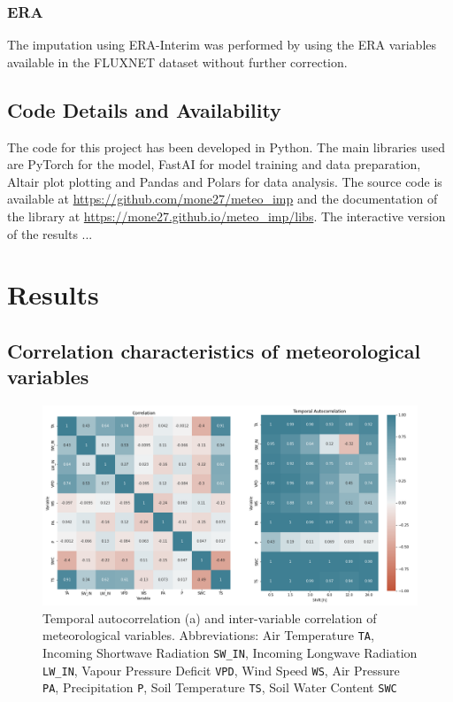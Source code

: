 \documentclass{article}
\let\Oldsection\section
\renewcommand{\section}{\FloatBarrier\Oldsection}
\let\Oldsubsection\subsection
\renewcommand{\subsection}{\FloatBarrier\Oldsubsection}
\begin{document}
\subsubsection{ERA} The imputation using ERA-Interim was performed by using the ERA variables available in the FLUXNET dataset without further correction.

\subsection{Code Details and Availability}

The code for this project has been developed in Python. The main libraries used are PyTorch for the model,  FastAI for model training and data preparation, Altair plot plotting and Pandas and Polars for data analysis. The source code is available at \url{https://github.com/mone27/meteo_imp} and the documentation of the library at \url{https://mone27.github.io/meteo_imp/libs}. %
The interactive version of the results ...
\pagebreak

\section{Results}

\subsection{Correlation characteristics of meteorological variables}

\begin{figure}
    \centerline{\includegraphics[width=7in]{correlation}}
    \caption{Temporal autocorrelation (a) and inter-variable correlation of meteorological variables.  Abbreviations: Air Temperature \texttt{TA}, Incoming Shortwave Radiation \texttt{SW\_IN}, Incoming Longwave Radiation \texttt{LW\_IN}, Vapour Pressure Deficit \texttt{VPD}, Wind Speed \texttt{WS}, Air Pressure \texttt{PA}, Precipitation \texttt{P}, Soil Temperature \texttt{TS}, Soil Water Content \texttt{SWC}}
    \label{fig:correlation}
\end{figure}
\end{document}
